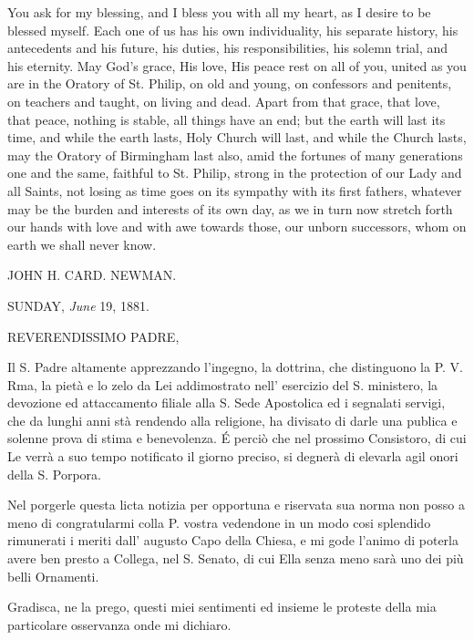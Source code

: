 You ask for my blessing, and I bless you with all my heart, as I
desire to be blessed myself. Each one of us has his own individuality,
his separate history, his antecedents and his future, his duties, his
responsibilities, his solemn trial, and his eternity. May God's grace,
His love, His peace rest on all of you, united as you are in the
Oratory of St. Philip, on old and young, on confessors and penitents,
on teachers and taught, on living and dead. Apart from that grace,
that love, that peace, nothing is stable, all things have an end; but
the earth will last its time, and while the earth lasts, Holy Church
will last, and while the Church lasts, may the Oratory of Birmingham
last also, amid the fortunes of many generations one and the
same, faithful to St. Philip, strong in the protection of our Lady and
all Saints, not losing as time goes on its sympathy with its first
fathers, whatever may be the burden and interests of its own day, as
we in turn now stretch forth our hands with love and with awe towards
those, our unborn successors, whom on earth we shall never know.

JOHN H. CARD. NEWMAN.

SUNDAY, \emph{June}
19, 1881.



REVERENDISSIMO PADRE,

Il S. Padre altamente apprezzando l'ingegno, la dottrina, che
distinguono la P. V. Rma, la pietà e lo zelo da Lei addimostrato nell'
esercizio del S. ministero, la devozione ed attaccamento filiale alla
S. Sede Apostolica ed i segnalati servigi, che da lunghi anni stà
rendendo alla religione, ha divisato di darle una publica e solenne
prova di stima e benevolenza. É perciò che nel prossimo Consistoro,
di cui Le verrà a suo tempo notificato il giorno preciso, si degnerà
di elevarla agil onori della S. Porpora.

Nel porgerle questa licta notizia per opportuna e riservata sua
norma non posso a meno di congratularmi colla P. vostra vedendone in
un modo cosi splendido rimunerati i meriti dall' augusto Capo della
Chiesa, e mi gode l'animo di poterla avere ben presto a Collega, nel
S. Senato, di cui Ella senza meno sarà uno dei più belli Ornamenti.

Gradisca, ne la prego, questi miei sentimenti ed insieme le
proteste della mia particolare osservanza onde mi dichiaro.

